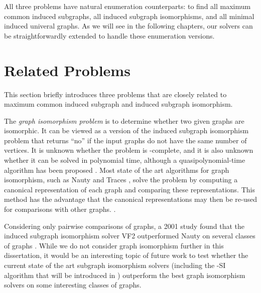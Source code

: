 All three problems have natural enumeration counterparts:
to find all maximum common induced subgraphs, all induced subgraph isomorphisms,
and all minimal induced univeral graphs.  As we will see in the following
chapters, our solvers can be straightforwardly extended to handle
these enumeration versions.

\section{Related Problems}\label{sec:related-problems}

This section briefly introduces three problems that are closely related to
maximum common induced subgraph and induced subgraph isomorphism.

The \emph{graph isomorphism problem} is to determine whether two given graphs are
isomorphic. It can be viewed as a version of the induced subgraph isomorphism
problem that returns ``no'' if the input graphs do not have the same number of
vertices.  It is unknown whether the problem is \NP-complete, and it is also
unknown whether it can be solved in polynomial time, although a
quasipolynomial-time algorithm has been proposed
\citep{DBLP:conf/stoc/Babai16}.  Most state of the art algorithms for graph
isomorphism, such as Nauty and Traces \citep{DBLP:journals/jsc/McKayP14}, solve the problem by computing a
canonical representation of each graph and comparing these representations.
This method has the advantage that the canonical
representations may then be re-used for comparisons with other graphs.
\citep{leon1991permutation,DBLP:journals/jsc/JeffersonPW19}.

Considering only pairwise comparisons of graphs, a 2001 study found that the
induced subgraph isomorphism solver VF2 outperformed Nauty on  several classes
of graphs \citep{foggia2001performance}.  While we do not consider graph
isomorphism further in this dissertation, it would be an interesting topic of
future work to test whether the current state of the art subgraph isomorphism
solvers (including the \McSplit-SI algorithm
that will be introduced in )
outperform the best graph isomorphism solvers on some interesting
classes of graphs.

